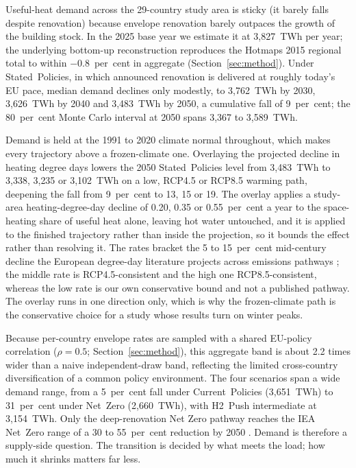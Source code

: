 Useful-heat demand across the 29-country study area is sticky (it barely falls despite
renovation) because envelope renovation barely outpaces the growth of the building
stock. In the 2025 base year we estimate it at 3{,}827~TWh per year; the underlying
bottom-up reconstruction reproduces the Hotmaps 2015 regional total to within
$-$0.8~per~cent in aggregate (Section~\ref{sec:method}). Under Stated~Policies, in which
announced renovation is delivered at roughly today's EU pace, median demand declines
only modestly, to 3{,}762~TWh by 2030, 3{,}626~TWh by 2040 and 3{,}483~TWh by 2050, a
cumulative fall of 9~per~cent; the 80~per~cent Monte Carlo interval at 2050 spans
3{,}367 to 3{,}589~TWh.

Demand is held at the 1991 to 2020 climate normal throughout, which makes every
trajectory above a frozen-climate one. Overlaying the projected decline in heating degree
days lowers the 2050 Stated~Policies level from 3{,}483~TWh to 3{,}338, 3{,}235 or
3{,}102~TWh on a low, RCP4.5 or RCP8.5 warming path, deepening the fall from 9~per~cent
to 13, 15 or 19. The overlay applies a study-area heating-degree-day decline of 0.20, 0.35
or 0.55~per~cent a year to the space-heating share of useful heat alone, leaving hot water
untouched, and it is applied to the finished trajectory rather than inside the projection,
so it bounds the effect rather than resolving it. The rates bracket the 5 to 15~per~cent
mid-century decline the European degree-day literature projects across emissions pathways
\citep{Spinoni2018degreedays}; the middle rate is RCP4.5-consistent and the high one
RCP8.5-consistent, whereas the low rate is our own conservative bound and not a published
pathway. The overlay runs in one direction only, which is why the frozen-climate path is
the conservative choice for a study whose results turn on winter peaks.

Because per-country envelope rates are sampled with a shared EU-policy correlation
($\rho=0.5$; Section~\ref{sec:method}), this aggregate band is about 2.2 times wider
than a naive independent-draw band, reflecting the limited cross-country diversification
of a common policy environment. The four scenarios span a wide demand range, from a
5~per~cent fall under Current~Policies (3{,}651~TWh) to 31~per~cent under Net~Zero
(2{,}660~TWh), with H2~Push intermediate at 3{,}154~TWh. Only the deep-renovation Net
Zero pathway reaches the IEA Net~Zero range of a 30 to 55~per~cent reduction by 2050
\citep{IEA2023NZE}. Demand is therefore a supply-side question. The transition is
decided by what meets the load; how much it shrinks matters far less.

